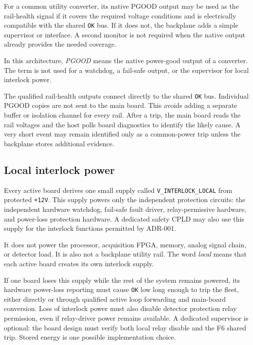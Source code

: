 For a common utility converter, its native PGOOD output may be used as the rail-health signal if it covers the required voltage conditions and is electrically compatible with the shared \texttt{OK} bus. If it does not, the backplane adds a simple supervisor or interface. A second monitor is not required when the native output already provides the needed coverage.

In this architecture, \emph{PGOOD} means the native power-good output of a converter. The term is not used for a watchdog, a fail-safe output, or the supervisor for local interlock power.

The qualified rail-health outputs connect directly to the shared \texttt{OK} bus. Individual PGOOD copies are not sent to the main board. This avoids adding a separate buffer or isolation channel for every rail. After a trip, the main board reads the rail voltages and the host polls board diagnostics to identify the likely cause. A very short event may remain identified only as a common-power trip unless the backplane stores additional evidence.

\subsection{Local interlock power}

Every active board derives one small supply called \texttt{V\_INTERLOCK\_LOCAL} from protected \texttt{+12V}. This supply powers only the independent protection circuits: the independent hardware watchdog, fail-safe fault driver, relay-permissive hardware, and power-loss protection hardware. A dedicated safety CPLD may also use this supply for the interlock functions permitted by ADR-001.

It does not power the processor, acquisition FPGA, memory, analog signal chain, or detector load. It is also not a backplane utility rail. The word \emph{local} means that each active board creates its own interlock supply.

If one board loses this supply while the rest of the system remains powered, its hardware power-loss reporting must cause \texttt{OK} low long enough to trip the fleet, either directly or through qualified active loop forwarding and main-board conversion. Loss of interlock power must also disable detector protection relay permission, even if relay-driver power remains available. A dedicated supervisor is optional: the board design must verify both local relay disable and the F6 shared trip. Stored energy is one possible implementation choice.

